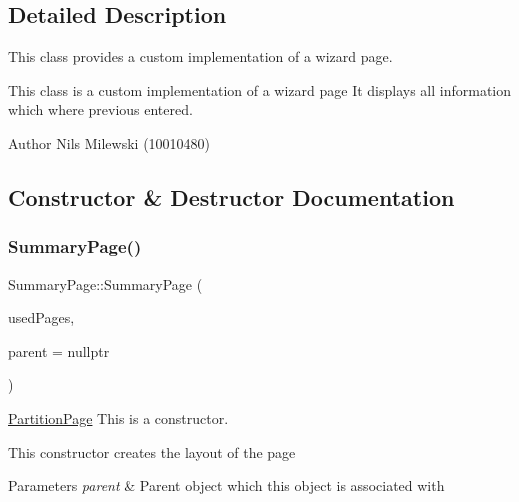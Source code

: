 \subsection{Detailed Description}
This class provides a custom implementation of a wizard page. 

This class is a custom implementation of a wizard page It displays all information which where previous entered. \begin{DoxyAuthor}{Author}
Nils Milewski (10010480) 
\end{DoxyAuthor}


\subsection{Constructor \& Destructor Documentation}
\mbox{\label{classui_1_1wizard_1_1pages_1_1_summary_page_a798aff071dddd63b2b5ee049fa87e6a7}} 
\subsubsection{\texorpdfstring{Summary\+Page()}{SummaryPage()}}
{\footnotesize\ttfamily Summary\+Page\+::\+Summary\+Page (\begin{DoxyParamCaption}\item[{int}]{used\+Pages,  }\item[{Q\+Widget $\ast$}]{parent = {\ttfamily nullptr} }\end{DoxyParamCaption})}



\mbox{\hyperlink{classui_1_1wizard_1_1pages_1_1_partition_page}{Partition\+Page}} This is a constructor. 

This constructor creates the layout of the page 
\begin{DoxyParams}{Parameters}
{\em parent} & Parent object which this object is associated with \\
\hline
\end{DoxyParams}
\mbox{\label{classui_1_1wizard_1_1pages_1_1_summary_page_a93b880d988f9f85f28c3d239ce1457e0}} 
